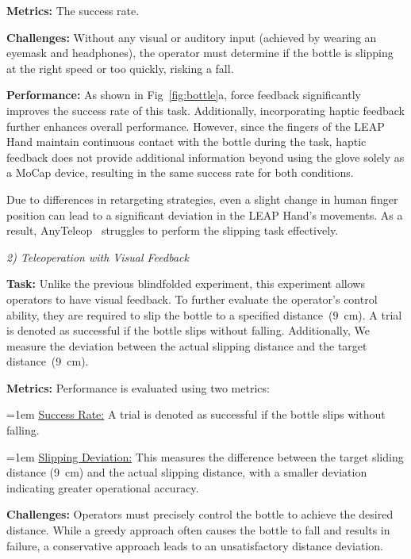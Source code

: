 \noindent \textbf{Metrics:} 
The success rate.

\noindent \textbf{Challenges:} 
Without any visual or auditory input (achieved by wearing an eyemask and headphones), the operator must determine if the bottle is slipping at the right speed or too quickly, risking a fall.

\noindent \textbf{Performance:}
As shown in Fig~\ref{fig:bottle}a, force feedback significantly improves the success rate of this task. Additionally, incorporating haptic feedback further enhances overall performance. However, since the fingers of the LEAP Hand maintain continuous contact with the bottle during the task, haptic feedback does not provide additional information beyond using the glove solely as a MoCap device, resulting in the same success rate for both conditions.

Due to differences in retargeting strategies, even a slight change in human finger position can lead to a significant deviation in the LEAP Hand’s movements. As a result, AnyTeleop~\cite{qin2023anyteleop} struggles to perform the slipping task effectively.

\vspace{1.5mm}

\noindent\textit{2) Teleoperation with Visual Feedback}


\noindent \textbf{Task:} 
Unlike the previous blindfolded experiment, this experiment allows operators to have visual feedback. To further evaluate the operator's control ability, they are required to slip the bottle to a specified distance~(9~cm). A trial is denoted as successful if the bottle slips without falling. Additionally, We measure the deviation between the actual slipping distance and the target distance~(9~cm).

\noindent \textbf{Metrics:} 
Performance is evaluated using two metrics:

\hangindent=1em
\noindent\textbullet\hspace{0.5em}\ul{Success Rate:} A trial is denoted as successful if the bottle slips without falling.

\hangindent=1em
\noindent\textbullet\hspace{0.5em}\ul{Slipping Deviation:} This measures the difference between the target sliding distance (9~cm) and the actual slipping distance, with a smaller deviation indicating greater operational accuracy.

\noindent \textbf{Challenges:} 
Operators must precisely control the bottle to achieve the desired distance. While a greedy approach often causes the bottle to fall and results in failure, a conservative approach leads to an unsatisfactory distance deviation.


